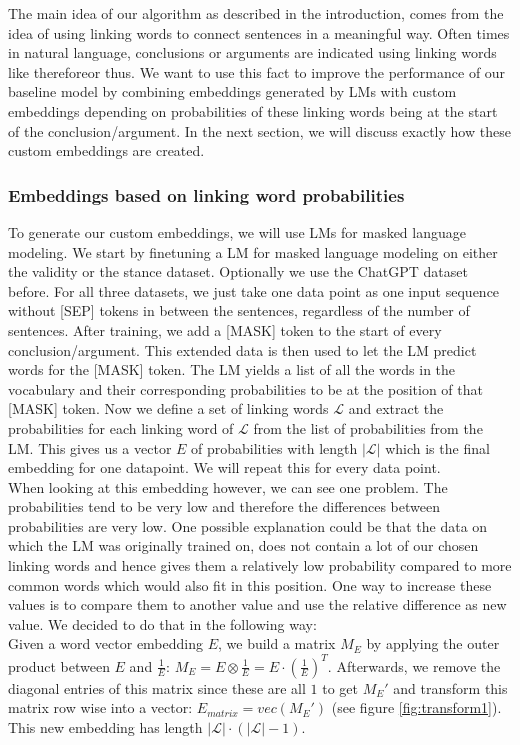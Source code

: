 The main idea of our algorithm as described in the introduction, comes from the idea of using linking words to connect sentences in a meaningful way. Often times in natural language, conclusions or arguments are indicated using linking words like \dq therefore\dq or \dq thus\dq. We want to use this fact to improve the performance of our baseline model by combining embeddings generated by LMs with custom embeddings depending on probabilities of these linking words being at the start of the conclusion/argument. In the next section, we will discuss exactly how these custom embeddings are created.

\subsubsection{Embeddings based on linking word probabilities}
To generate our custom embeddings, we will use LMs for masked language modeling. We start by finetuning a LM for masked language modeling \cite{bertmask} on either the validity or the stance dataset. Optionally we use the ChatGPT dataset before. For all three datasets, we just take one data point as one input sequence without [SEP] tokens in between the sentences, regardless of the number of sentences. After training, we add a [MASK] token to the start of every conclusion/argument. This extended data is then used to let the LM predict words for the [MASK] token. The LM yields a list of all the words in the vocabulary and their corresponding probabilities to be at the position of that [MASK] token. Now we define a set of linking words $\mathcal{L}$ and extract the probabilities for each linking word of $\mathcal{L}$ from the list of probabilities from the LM. This gives us a vector $E$ of probabilities with length $|\mathcal{L}|$ which is the final embedding for one datapoint. We will repeat this for every data point. \\

When looking at this embedding however, we can see one problem. The probabilities tend to be very low and therefore the differences between probabilities are very low. One possible explanation could be that the data on which the LM was originally trained on, does not contain a lot of our chosen linking words and hence gives them a relatively low probability compared to more common words which would also fit in this position. One way to increase these values is to compare them to another value and use the relative difference as new value. We decided to do that in the following way: \\
Given a word vector embedding $E$, we build a matrix $M_E$ by applying the outer product between $E$ and $\frac{1}{E}$: $M_E = E \otimes \frac{1}{E} = E \cdot (\frac{1}{E})^T$.
Afterwards, we remove the diagonal entries of this matrix since these are all $1$ to get $M_E'$ and transform this matrix row wise into a vector: $E_{matrix} = vec(M_E')$ (see figure \ref{fig:transform1}). This new embedding has length $|\mathcal{L}| \cdot (|\mathcal{L}|-1)$.

